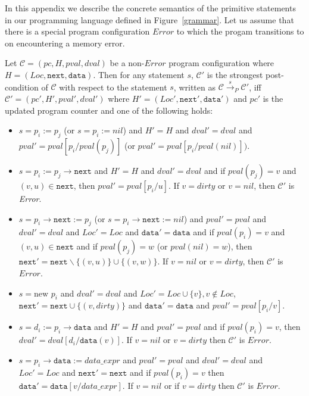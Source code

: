 \documentclass{llncs}
\newcommand{\next}{\texttt{next}}
\newcommand{\Loc}{\mathit{Loc}}
\newcommand{\data}{\texttt{data}}
\begin{document}
In this appendix we describe the concrete semantics of the primitive statements in our programming language defined in Figure~\ref{grammar}.
Let us assume that there is a special program configuration $Error$ to which the progam transitions to on encountering a memory error. 

\begin{definition}
Let $\mathcal{C} = (pc, H, pval, dval)$ be a non-$Error$ program configuration where $H = (Loc, \next, \data)$. Then for any statement  $s$, $\mathcal{C'}$ is the strongest post-condition of $\mathcal{C}$ with respect to the statement $s$, written as $\mathcal{C} \xrightarrow{\mathit{s}}_P \mathcal{C'}$, iff $\mathcal{C'} = (pc', H', pval', dval')$ where $H' = (Loc', \next', \data')$ and $pc'$ is the updated program counter and 
one of the following holds:


\begin{itemize}

\item $s = p_i := p_j$ (or $s = p_i := nil$) and  $H' = H$ and $dval' = dval$ and $pval' = pval[p_i/pval(p_j)]$ (or $pval' = pval[p_i/pval(nil)])$.




\item $s = p_i := p_j\rightarrow\next$ and $H' = H$ and $dval' = dval$ and if $pval(p_j) = v$ and $(v, u) \in \next$, then $pval' = pval[p_i/u]$. If $v = dirty$ or $v = nil$, then $\mathcal{C'}$ is \emph{Error}.

\item $s = p_i\rightarrow\next := p_j$ (or $s = p_i\rightarrow\next := nil$) and $pval' = pval$ and $dval' = dval$ and $Loc' = Loc$ and $\data' = \data$ and if $pval(p_i) = v$ and $(v, u) \in \next$ and if $pval(p_j) = w$ (or $pval(nil) = w$), then $\next' = \next \backslash \{(v, u)\} \cup \{(v, w)\}$. If $v = nil$ or $v = dirty$, then $\mathcal{C'}$ is $Error$.

\item $s = \text{new } p_i$ and $dval' = dval$ and $\Loc' = \Loc \cup \{v\}, v \notin \Loc$, $\next' = \next \cup \{(v, dirty)\}$ and $\data' = \data$ and $pval' = pval[p_i/v]$.


\item $s = d_i := p_i\rightarrow\data$ and $H' = H$ and $pval' = pval$ and  if $pval(p_i) = v$, then $dval' = dval[d_i/\data(v)]$.
If $v = nil$ or $v = dirty$ then $\mathcal{C'}$ is $Error$.


\item $s = p_i\rightarrow\data := data\_expr$ and $pval' = pval$ and $dval' = dval$ and $Loc' = Loc$ and $\next' = \next$ and  if $pval(p_i) = v$ then $\data' = \data[v/data\_expr]$.
If $v = nil$ or if $v = dirty$ then $\mathcal{C'}$ is $Error$.


\end{itemize}
\end{definition}
\end{document}
